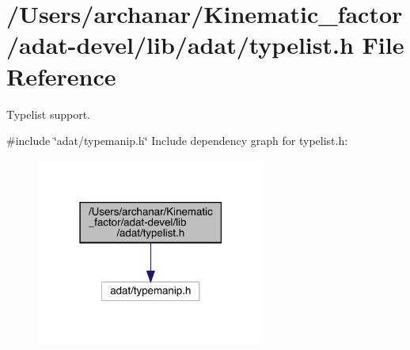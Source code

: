 \hypertarget{adat-devel_2lib_2adat_2typelist_8h}{}\section{/\+Users/archanar/\+Kinematic\+\_\+factor/adat-\/devel/lib/adat/typelist.h File Reference}
\label{adat-devel_2lib_2adat_2typelist_8h}


Typelist support.  


{\ttfamily \#include \char`\"{}adat/typemanip.\+h\char`\"{}}\newline
Include dependency graph for typelist.\+h\+:
\nopagebreak
\begin{figure}[H]
\begin{center}
\leavevmode
\includegraphics[width=214pt]{df/d27/adat-devel_2lib_2adat_2typelist_8h__incl}
\end{center}
\end{figure}
